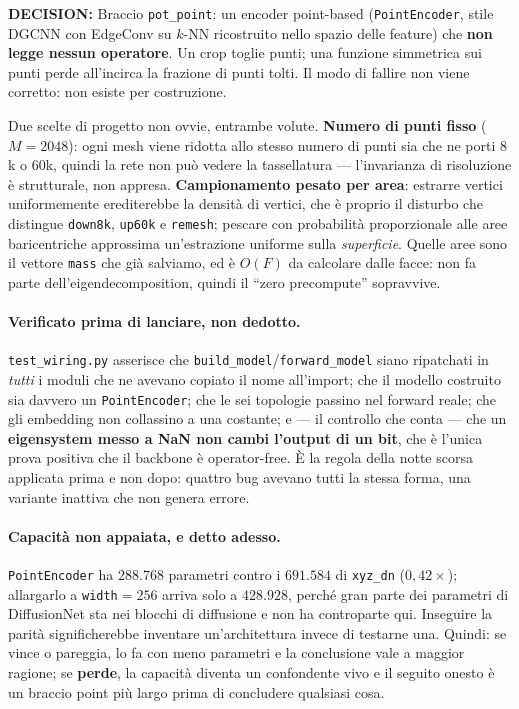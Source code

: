 \documentclass[11pt,a4paper]{article}
\newcommand{\decision}[1]{\textcolor{decision}{\textbf{DECISION:}} #1}
\begin{document}
\decision{Braccio \texttt{pot\_point}: un encoder point-based (\texttt{PointEncoder}, stile
DGCNN con EdgeConv su $k$-NN ricostruito nello spazio delle feature) che \textbf{non legge
nessun operatore}. Un crop toglie punti; una funzione simmetrica sui punti perde all'incirca la
frazione di punti tolti. Il modo di fallire non viene corretto: non esiste per costruzione.}

Due scelte di progetto non ovvie, entrambe volute. \textbf{Numero di punti fisso} ($M=2048$):
ogni mesh viene ridotta allo stesso numero di punti sia che ne porti $8$k o $60$k, quindi la
rete non pu\`o vedere la tassellatura --- l'invarianza di risoluzione \`e strutturale, non
appresa. \textbf{Campionamento pesato per area}: estrarre vertici uniformemente erediterebbe la
densit\`a di vertici, che \`e proprio il disturbo che distingue \texttt{down8k},
\texttt{up60k} e \texttt{remesh}; pescare con probabilit\`a proporzionale alle aree
baricentriche approssima un'estrazione uniforme sulla \emph{superficie}. Quelle aree sono il
vettore \texttt{mass} che gi\`a salviamo, ed \`e $O(F)$ da calcolare dalle facce: non fa parte
dell'eigendecomposition, quindi il ``zero precompute'' sopravvive.

\paragraph{Verificato prima di lanciare, non dedotto.} \texttt{test\_wiring.py} asserisce che
\texttt{build\_model}/\texttt{forward\_model} siano ripatchati in \emph{tutti} i moduli che ne
avevano copiato il nome all'import; che il modello costruito sia davvero un
\texttt{PointEncoder}; che le sei topologie passino nel forward reale; che gli embedding non
collassino a una costante; e --- il controllo che conta --- che un \textbf{eigensystem messo a
NaN non cambi l'output di un bit}, che \`e l'unica prova positiva che il backbone \`e
operator-free. \`E la regola della notte scorsa applicata prima e non dopo: quattro bug avevano
tutti la stessa forma, una variante inattiva che non genera errore.

\paragraph{Capacit\`a non appaiata, e detto adesso.} \texttt{PointEncoder} ha $288{.}768$
parametri contro i $691{.}584$ di \texttt{xyz\_dn} ($0{,}42\times$); allargarlo a
\texttt{width}$=256$ arriva solo a $428{.}928$, perch\'e gran parte dei parametri di
DiffusionNet sta nei blocchi di diffusione e non ha controparte qui. Inseguire la parit\`a
significherebbe inventare un'architettura invece di testarne una. Quindi: se vince o pareggia,
lo fa con meno parametri e la conclusione vale a maggior ragione; se \textbf{perde}, la
capacit\`a diventa un confondente vivo e il seguito onesto \`e un braccio point pi\`u largo
prima di concludere qualsiasi cosa.
\end{document}
